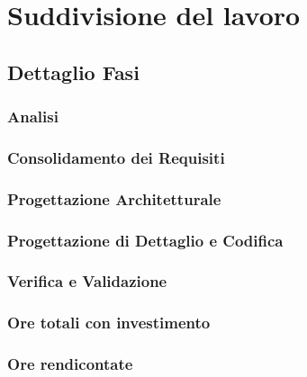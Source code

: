 \section{Suddivisione del lavoro}
	\subsection{Dettaglio Fasi}
		\subsubsection{Analisi}
		\subsubsection{Consolidamento dei Requisiti}
		\subsubsection{Progettazione Architetturale}
		\subsubsection{Progettazione di Dettaglio e Codifica}
		\subsubsection{Verifica e Validazione}
		\subsubsection{Ore totali con investimento}
		\subsubsection{Ore rendicontate}